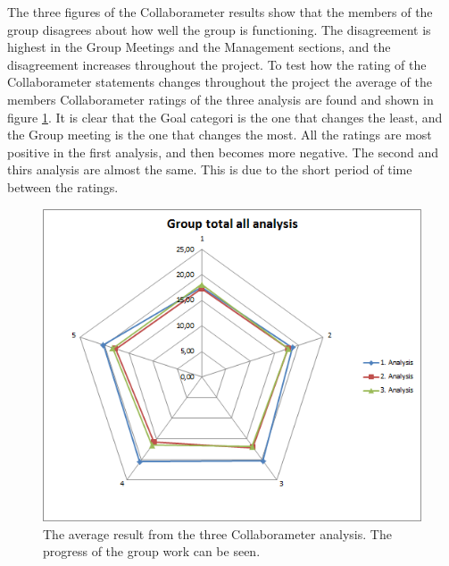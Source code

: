 The three figures of the Collaborameter results show that the members of the group disagrees about how well the group is functioning. The disagreement is highest in the Group Meetings and the Management sections, and the disagreement increases throughout the project. To test how the rating of the Collaborameter statements changes throughout the project the average of the members Collaborameter ratings of the three analysis are found and shown in figure \ref{fig:ALLanalysisCollaborameter}. It is clear that the Goal categori is the one that changes the least, and the Group meeting is the one that changes the most. All the ratings are most positive in the first analysis, and then becomes more negative. The second and thirs analysis are almost the same. This is due to the short period of time between the ratings. 
\begin{figure}
\centering
\includegraphics[width=0.7\linewidth]{./graphics/ALLanalysisCollaborameter}
\caption{The average result from the three Collaborameter analysis. The progress of the group work can be seen.}
\label{fig:ALLanalysisCollaborameter}
\end{figure}

